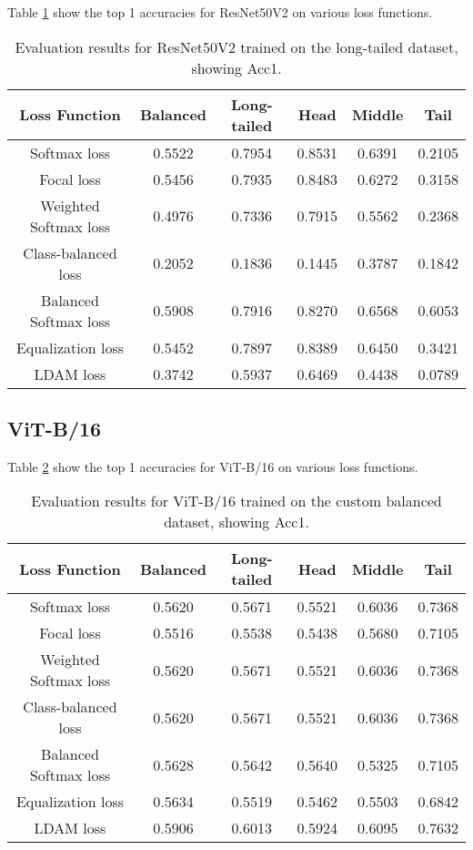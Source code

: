 Table \ref{tab:resnet_lt_acc1_1} show the top 1 accuracies for ResNet50V2 on various loss functions.

\begin{table}[H]
    \centering
    \begin{tabular}{cccccc}
        \toprule
        Loss Function & Balanced & Long-tailed & Head & Middle & Tail \\ 
        \midrule
        Softmax loss   & 0.5522 & 0.7954 & 0.8531 & 0.6391 & 0.2105 \\
        Focal loss   & 0.5456 & 0.7935 & 0.8483 & 0.6272 & 0.3158 \\
        Weighted Softmax loss   & 0.4976 & 0.7336 & 0.7915 & 0.5562 & 0.2368 \\
        Class-balanced loss   & 0.2052 & 0.1836 &  0.1445 & 0.3787 & 0.1842 \\
        Balanced Softmax loss   & 0.5908 & 0.7916 & 0.8270 & 0.6568 & 0.6053 \\
        Equalization loss   & 0.5452 & 0.7897 & 0.8389 & 0.6450 & 0.3421 \\
        LDAM loss   & 0.3742 & 0.5937 & 0.6469 & 0.4438 & 0.0789 \\
        \bottomrule
    \end{tabular}
    \caption{Evaluation results for ResNet50V2 trained on the long-tailed dataset, showing Acc1.}
    \label{tab:resnet_lt_acc1_1}
\end{table}

\subsection{ViT-B/16}

Table \ref{tab:vit_bal_acc1_1} show the top 1 accuracies for ViT-B/16 on various loss functions.

\begin{table}[H]
    \centering
    \begin{tabular}{cccccc}
        \toprule
        Loss Function & Balanced & Long-tailed & Head & Middle & Tail \\ 
        \midrule
        Softmax loss   & 0.5620 & 0.5671 & 0.5521 & 0.6036 & 0.7368 \\
        Focal loss   & 0.5516 & 0.5538 & 0.5438 & 0.5680 & 0.7105 \\
        Weighted Softmax loss   & 0.5620 & 0.5671 & 0.5521 & 0.6036 & 0.7368 \\
        Class-balanced loss   & 0.5620 & 0.5671 &  0.5521 & 0.6036 & 0.7368 \\
        Balanced Softmax loss   & 0.5628 & 0.5642 & 0.5640 & 0.5325 & 0.7105 \\
        Equalization loss   & 0.5634   & 0.5519 & 0.5462 & 0.5503 & 0.6842 \\
        LDAM loss   & 0.5906 &  0.6013 & 0.5924 & 0.6095 & 0.7632 \\
        \bottomrule
    \end{tabular}
    \caption{Evaluation results for ViT-B/16 trained on the custom balanced dataset, showing Acc1.}
    \label{tab:vit_bal_acc1_1}
\end{table}

